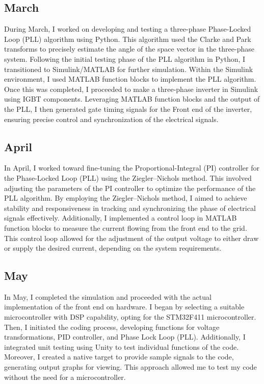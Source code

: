 \subsection{March}

During March, I worked on developing and testing a three-phase Phase-Locked
Loop (PLL) algorithm using Python. This algorithm used the Clarke and Park
transforms to precisely estimate the angle of the space vector in the
three-phase system. Following the initial testing phase of the PLL algorithm in
Python, I transitioned to Simulink/MATLAB for further simulation. Within the
Simulink environment, I used MATLAB function blocks to implement the PLL
algorithm. Once this was completed, I proceeded to make a three-phase inverter
in Simulink using IGBT components. Leveraging MATLAB function blocks and the
output of the PLL, I then generated gate timing signals for the Front end of
the inverter, ensuring precise control and synchronization of the electrical
signals.

\subsection{April}

In April, I worked toward fine-tuning the Proportional-Integral (PI) controller
for the Phase-Locked Loop (PLL) using the Ziegler–Nichols method. This involved
adjusting the parameters of the PI controller to optimize the performance of
the PLL algorithm. By employing the Ziegler–Nichols method, I aimed to achieve
stability and responsiveness in tracking and synchronizing the phase of
electrical signals effectively. Additionally, I implemented a control loop in
MATLAB function blocks to measure the current flowing from the front end to the
grid. This control loop allowed for the adjustment of the output voltage to
either draw or supply the desired current, depending on the system
requirements.

\subsection{May}
In May, I completed the simulation and proceeded with the actual implementation
of the front end on hardware. I began by selecting a suitable microcontroller
with DSP capability, opting for the STM32F411 microcontroller. Then, I
initiated the coding process, developing functions for voltage transformations,
PID controller, and Phase Lock Loop (PLL). Additionally, I integrated unit
testing using Unity to test individual functions of the code. Moreover, I
created a native target to provide sample signals to the code, generating
output graphs for viewing. This approach allowed me to test my code without the
need for a microcontroller.

